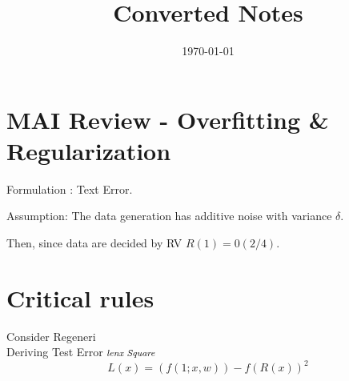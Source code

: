 \documentclass[12pt, a4paper]{article}
\title{Converted Notes}
\author{}
\date{\today}
\begin{document}
\maketitle

\section*{MAI Review - Overfitting \& Regularization}
Formulation : Text Error.

Assumption: The data generation has additive noise with variance $\delta$.

Then, since data are decided by RV $R(1) = 0 (2/4)$.

\section*{Critical rules}
Consider Regeneri\\

Deriving Test Error $\footnotesize{\textit{lenx Square}}$ \\[0.5ex]

\[ L(x) = (f(1; x, w)) - f(R(x))^2 \]


\end{document}
